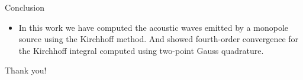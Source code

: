 \documentclass[10pt, aspectratio=169]{beamer}
\begin{document}
\begin{frame}{Conclusion}
	\begin{itemize}
		\item In this work we have computed the acoustic waves emitted by a monopole source using the Kirchhoff method. And showed fourth-order convergence for the Kirchhoff integral computed using two-point Gauss quadrature.
	\end{itemize}
\end{frame}

\begin{frame}[standout]
	Thank you!
\end{frame}
\end{document}
